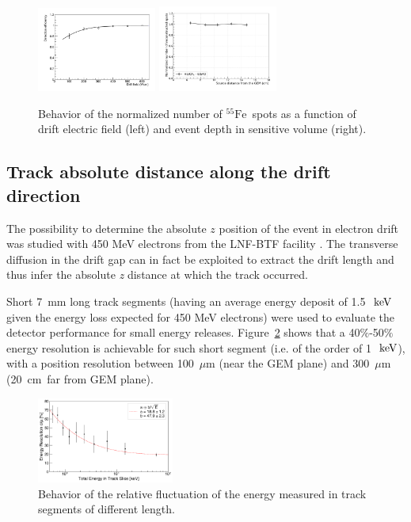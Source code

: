 \documentclass[physics,article,submit,moreauthors,pdftex]{Definitions/mdpi}
\newcommand{\fe}{\ensuremath{^{55}\textrm{Fe}}\xspace}
\newcommand{\keV}{\ensuremath{\,\textrm{ke\hspace{-.08em}V}}\xspace}
\begin{document}
\begin{figure}[t!]
\centering
\includegraphics[width=0.35\textwidth]{gEff_Edrift.pdf}
\includegraphics[width=0.35\textwidth]{feZscan6040_wo_4.pdf}
\caption{Behavior of the normalized number of \fe~spots as a function of drift electric field (left) and event depth in sensitive volume (right).} 
\label{fig:deteff}
\end{figure}


\subsection{Track absolute distance along the drift direction}\label{sec:track}
The possibility to determine the absolute $z$ position of the event in electron drift was studied with 450 MeV electrons from the LNF-BTF facility \cite{bib:lemon_btf}. The  transverse diffusion in the drift gap can in fact be exploited to extract the drift length and thus infer the absolute {\it z} distance at which the track occurred. 

Short 7~mm long track segments (having an average energy deposit of 1.5~\keV given the energy loss expected for 450 MeV electrons) were used to evaluate the detector performance for small energy releases. Figure~\ref{fig:eres} shows that a 40$\%$-50$\%$ energy resolution is achievable for such short segment (i.e. of the order of 1~\keV), with a position resolution between 100~$\mu$m (near the GEM plane) and 300~$\mu$m (20~cm~far from GEM plane).

\begin{figure}[t!]
\centering
\includegraphics[width=0.40\textwidth]{EResBTF.pdf}
\caption{Behavior of the relative fluctuation of the energy measured in track segments of different length.} 
\label{fig:eres}
\end{figure}
\end{document}
